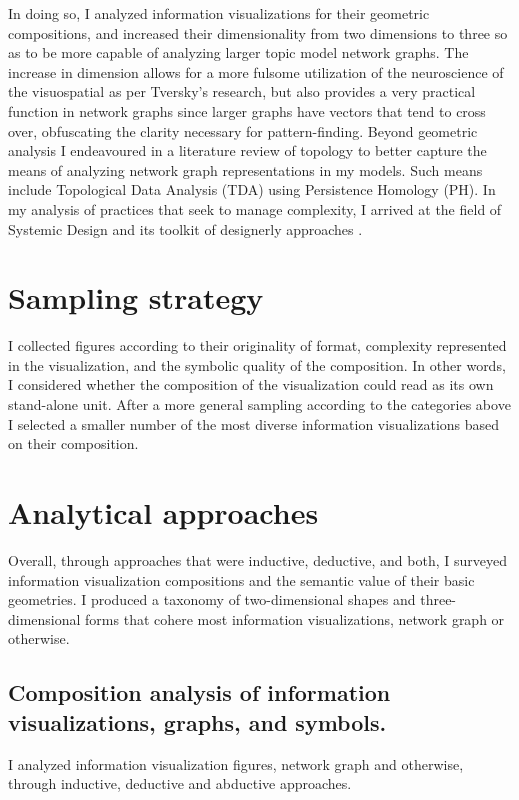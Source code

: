 In doing so, I analyzed information visualizations for their geometric compositions, and increased their dimensionality from two dimensions to three so as to be more capable of analyzing larger topic model network graphs. The increase in dimension allows for a more fulsome utilization of the neuroscience of the visuospatial as per Tversky’s research, but also provides a very practical function in network graphs since larger graphs have vectors that tend to cross over, obfuscating the clarity necessary for pattern-finding. Beyond geometric analysis I endeavoured in a literature review of topology to better capture the means of analyzing network graph representations in my models. Such means include Topological Data Analysis (TDA) using Persistence Homology (PH). In my analysis of practices that seek to manage complexity, I arrived at the field of Systemic Design and its toolkit of designerly approaches \citep{sevaldson_giga-mapping_2011,jones_synthesis_2016,sevaldson_designing_2022,kjode_entanglement_2024}.
 


\section{Sampling strategy}
I collected figures according to their originality of format, complexity represented in the visualization, and the symbolic quality of the composition. In other words, I considered whether the composition of the visualization could read as its own stand-alone unit. After a more general sampling according to the categories above I selected a smaller number of the most diverse information visualizations based on their composition. 

\section{Analytical approaches}
Overall, through approaches that were inductive, deductive, and both, I surveyed information visualization compositions and the semantic value of their basic geometries. I produced a taxonomy of two-dimensional shapes and three-dimensional forms that cohere most information visualizations, network graph or otherwise. 


\subsection{Composition analysis of information visualizations, graphs, and symbols. }
I analyzed information visualization figures, network graph and otherwise, through inductive, deductive and abductive approaches. 
 

